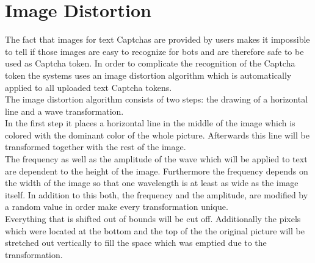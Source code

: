 \section{Image Distortion}
\label{sec:image_distortion}

The fact that images for text Captchas are provided by users makes it impossible to tell if those images are easy to recognize for bots and are therefore safe to be used as Captcha token. In order to complicate the recognition of the Captcha token the systems uses an image distortion algorithm which is automatically applied to all uploaded text Captcha tokens.\\
The image distortion algorithm consists of two steps: the drawing of a horizontal line and a wave transformation. \\
In the first step it places a horizontal line in the middle of the image which is colored with the dominant color of the whole picture. Afterwards this line will be transformed together with the rest of the image.\\
The frequency as well as the amplitude of the wave which will be applied to text are dependent to the height of the image. Furthermore the frequency depends on the width of the image so that one wavelength is at least as wide as the image itself. In addition to this both, the frequency and the amplitude, are modified by a random value in order make every transformation unique. \\
Everything that is shifted out of bounds will be cut off. Additionally the pixels which were located at the bottom and the top of the the original picture will be stretched out vertically to fill the space which was emptied due to the transformation.\\
